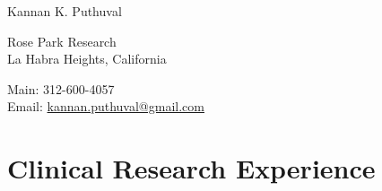 \documentclass[letterpaper]{article}
\def\name{Kannan K. Puthuval}
\begin{document}
{\huge \name}


\vspace{0.25in}

\begin{minipage}{0.45\linewidth}
  Rose Park Research \\
  La Habra Heights, California \\
\end{minipage}
\begin{minipage}{0.45\linewidth}
  Main: 312-600-4057 \\
  Email: \href{mailto:kannan.puthuval@gmail.com}{kannan.puthuval@gmail.com} \\
\end{minipage}

\section*{Clinical Research Experience}
\end{document}
